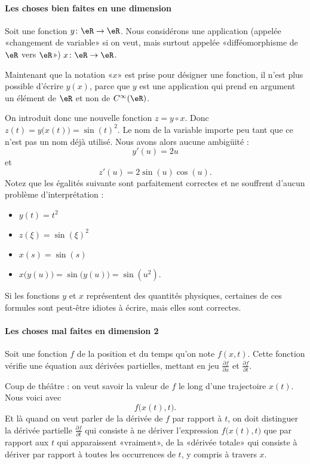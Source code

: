 \paragraph{Les choses bien faites en une dimension}

Soit une fonction \( y\colon \eR\to \eR\). Nous considérons une application (appelée «changement de variable» si on veut, mais surtout appelée «difféomorphisme de \( \eR\) vers $\eR$») \( x\colon \eR\to \eR\).

Maintenant que la notation «\( x\)» est prise pour désigner une fonction, il n'est plus possible d'écrire \( y(x)\), parce que \( y\) est une application qui prend en argument un élément de \( \eR\) et non de \(  C^{\infty}(\eR)\).

On introduit donc une nouvelle fonction \( z=y\circ x\). Donc \( z(t)=y\big( x(t) \big)=\sin(t)^2\). Le nom de la variable importe peu tant que ce n'est pas un nom déjà utilisé. Nous avons alors aucune ambigüité :
\begin{equation}
    y'(u)=2u
\end{equation}
et
\begin{equation}
    z'(u)=2\sin(u)\cos(u).
\end{equation}
Notez que les égalités suivante sont parfaitement correctes et ne souffrent d'aucun problème d'interprétation :
\begin{itemize}
    \item 
        \( y(t)=t^2\) 
    \item
        \( z(\xi)=\sin(\xi)^2\)
    \item
        \( x(s)=\sin(s)\)
    \item
        \( x\big( y(u) \big)=\sin\big( y(u) \big)=\sin(u^2)\).
\end{itemize}
    Si les fonctions \( y\) et \( x\) représentent des quantités physiques, certaines de ces formules sont peut-être idiotes à écrire, mais elles sont correctes.

\paragraph{Les choses mal faites en dimension 2}

    Soit une fonction \( f\) de la position et du temps qu'on note \( f(x,t)\). Cette fonction vérifie une équation aux dérivées partielles, mettant en jeu \( \frac{ \partial f }{ \partial x }\) et \( \frac{ \partial f }{ \partial t }\).

    Coup de théâtre : on veut savoir la valeur de \( f\) le long d'une trajectoire \( x(t)\). Nous voici avec
    \begin{equation}
        f\big( x(t), t \big).
    \end{equation}
    Et là quand on veut parler de la dérivée de \( f\) par rapport à \( t\), on doit distinguer la dérivée partielle \( \frac{ \partial f }{ \partial t }\) qui consiste à ne dériver l'expression \( f\big( x(t),t \big)\) que par rapport aux \( t\) qui apparaissent «vraiment», de la «dérivée totale» qui consiste à dériver par rapport à toutes les occurrences de \( t\), y compris à travers \( x\).

